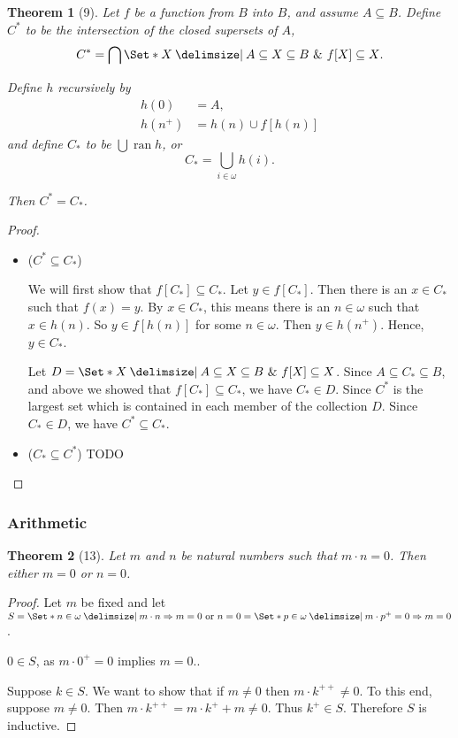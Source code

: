 \documentclass[12pt]{article}
\theoremstyle{plain}
\newtheorem*{exthm}{Theorem}
\theoremstyle{remark}
\theoremstyle{definition}
\theoremstyle{remark}
\providecommand\st{}
\newcommand\SetSymbol[1][]{%
  \nonscript\:#1\vert%
  \allowbreak%
  \nonscript\:
\mathopen{}}
\renewcommand\st{\SetSymbol[\delimsize]}
\DeclareMathOperator{\ran}{ran}
\begin{document}
\begin{exthm}[9]
  Let $f$ be a function from $B$ into $B$, and assume $A \subseteq B$. Define $C^*$ to be the intersection of the closed supersets of $A$,
  \begin{equation*}
    C^* = \bigcap \Set*{X \st A \subseteq X \subseteq B \ \&\ f[X] \subseteq X}.
  \end{equation*}

  Define $h$ recursively by
  \begin{align*}
    h(0) &= A,\\
    h(n^+) &= h(n) \cup f[h(n)]
  \end{align*}
  and define $C_*$ to be $\bigcup \ran{h}$, or
  \begin{equation*}
    C_* = \bigcup_{i \in \omega} h(i).
  \end{equation*}

  Then $C^* = C_*$.
\end{exthm}
\begin{proof}
  \begin{itemize}
    \item ($C^* \subseteq C_*$)

      We will first show that $f[C_*] \subseteq C_*$. Let $y \in
      f[C_*]$. Then there is an $x \in C_*$ such that $f(x) = y$.
      By $x \in C_*$, this means there is an $n \in \omega$ such that
      $x \in h(n)$. So $y \in f[h(n)]$ for some $n \in \omega$.
      Then $y \in h(n^+)$. Hence, $y \in C_*$.

      Let $D = \Set*{X \st A \subseteq X \subseteq B \ \&\ f[X] \subseteq X}$.
      Since $A \subseteq C_* \subseteq B$, and above we showed that $f[C_*]
      \subseteq C_*$, we have $C_* \in D$.
      Since $C^*$ is the largest set which is contained in each
      member of the collection $D$. Since $C_* \in D$, we have
      $C^* \subseteq C_*$.

    \item ($C_* \subseteq C^*$) TODO
  \end{itemize}
\end{proof}

\subsubsection{Arithmetic}
\begin{exthm}[13]
  Let $m$ and $n$ be natural numbers such that $m \cdot n = 0$. Then either $m = 0$ or $n = 0$.
\end{exthm}
\begin{proof}
  Let $m$ be fixed and let $S = \Set*{n \in \omega \st m \cdot n \Rightarrow m = 0 \text{ or } n = 0} = \Set*{p \in \omega \st m \cdot p^+ = 0 \Rightarrow m = 0}$.

  $0 \in S$, as $m \cdot 0^+ = 0$ implies $m = 0$..

  Suppose $k \in S$. We want to show that if $m \neq 0$ then $m \cdot k^{++} \neq 0$. To this end, suppose $m \neq 0$. Then $m \cdot k^{++} = m \cdot k^+ +m \neq 0$. Thus $k^+ \in S$. Therefore $S$ is inductive.
\end{proof}
\end{document}
